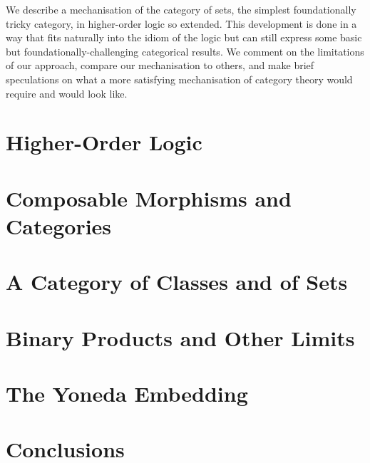 \documentclass[twoside,titlepage,11pt]{article}
\begin{document}
We describe a mechanisation of the category of sets, the simplest foundationally tricky category, in higher-order logic so extended.
This development is done in a way that fits naturally into the idiom of the logic but can still express some basic but foundationally-challenging categorical results.
We comment on the limitations of our approach, compare our mechanisation to others, and make brief speculations on what a more satisfying mechanisation of category theory would require and would look like.
\section{Higher-Order Logic}%
\section{Composable Morphisms and Categories}%
\section{A Category of Classes and of Sets}%
\section{Binary Products and Other Limits}%
\section{The Yoneda Embedding}%
\section{Conclusions}%


\end{document}
